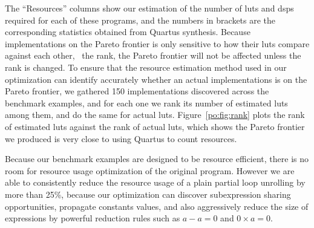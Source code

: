 \begin{figure*}[ht]
    \centering
    \begin{minipage}{0.6\textwidth}
    \end{minipage}\quad\begin{minipage}{0.35\textwidth}
    \end{minipage}
\end{figure*}

The ``Resources'' columns show our estimation of the number of \glspl{lut}
and \glspl{dsp} required for each of these programs, and the numbers in
brackets are the corresponding statistics obtained from Quartus synthesis.
Because implementations on the Pareto frontier is only sensitive to how
their \glspl{lut} compare against each other, \ie~the rank, the Pareto
frontier will not be affected unless the rank is changed.  To ensure that the
resource estimation method used in our optimization can identify accurately
whether an actual implementations is on the Pareto frontier, we gathered 150
implementations discovered across the benchmark examples, and for each one we
rank its number of estimated \glspl{lut} among them, and do the same for actual
\glspl{lut}.  Figure~\ref{po:fig:rank} plots the rank of estimated \glspl{lut}
against the rank of actual \glspl{lut}, which shows the Pareto frontier we
produced is very close to using Quartus to count resources.

Because our benchmark examples are designed to be resource efficient, there
is no room for resource usage optimization of the original program.  However
we are able to consistently reduce the resource usage of a plain partial
loop unrolling by more than 25\%, because our optimization can discover
subexpression sharing opportunities, propagate constants values, and also
aggressively reduce the size of expressions by powerful reduction rules such as
$a - a = 0$ and $0 \times a = 0$.

